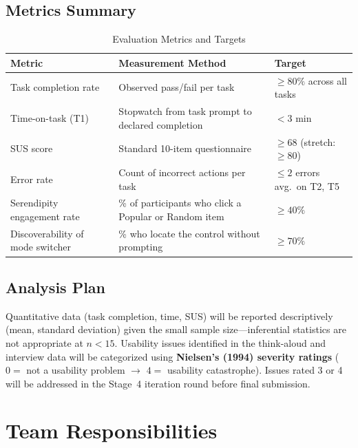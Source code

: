 \documentclass[14pt]{article}
\begin{document}
\subsection{Metrics Summary}

\begin{table}[H]
\centering
\caption{Evaluation Metrics and Targets}
\renewcommand{\arraystretch}{1.3}
\begin{tabularx}{\textwidth}{l X l}
\toprule
\textbf{Metric} & \textbf{Measurement Method} & \textbf{Target} \\
\midrule
Task completion rate           & Observed pass/fail per task                              & $\geq 80\%$ across all tasks \\
Time-on-task (T1)              & Stopwatch from task prompt to declared completion        & $< 3$ min \\
SUS score                      & Standard 10-item questionnaire                           & $\geq 68$ (stretch: $\geq 80$) \\
Error rate                     & Count of incorrect actions per task                      & $\leq 2$ errors avg.\ on T2, T5 \\
Serendipity engagement rate    & \% of participants who click a Popular or Random item    & $\geq 40\%$ \\
Discoverability of mode switcher & \% who locate the control without prompting            & $\geq 70\%$ \\
\bottomrule
\end{tabularx}
\end{table}

\subsection{Analysis Plan}

Quantitative data (task completion, time, SUS) will be reported descriptively (mean, standard deviation) given the small sample size---inferential statistics are not appropriate at $n < 15$. Usability issues identified in the think-aloud and interview data will be categorized using \textbf{Nielsen's (1994) severity ratings} ($0 =$ not a usability problem $\rightarrow$ $4 =$ usability catastrophe). Issues rated 3 or 4 will be addressed in the Stage~4 iteration round before final submission.

\section{Team Responsibilities}
\end{document}
